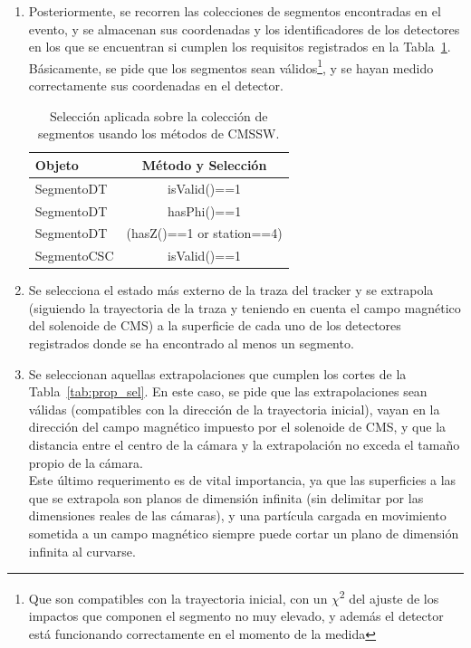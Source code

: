 \begin{enumerate}
\item Posteriormente, se recorren las colecciones de segmentos encontradas en el evento, y se almacenan sus coordenadas y los identificadores de los detectores en los que se encuentran si cumplen los requisitos registrados en la Tabla~\ref{tab:segment_sel}. B\'asicamente, se pide que los segmentos sean v\'alidos\footnote{Que son compatibles con la trayectoria inicial, con un $\chi$\textsuperscript{2} del ajuste de los impactos que componen el segmento no muy elevado, y adem\'as el detector est\'a funcionando correctamente en el momento de la medida}, y se hayan medido correctamente sus coordenadas en el detector.

\begin{table}[htbp]
  \begin{center}
    {\normalsize
      \begin{tabular} {lc}
        \hline
        \hline
        Objeto & M\'etodo y Selecci\'on                    \\
        \hline
        SegmentoDT            & isValid()==1               \\
        SegmentoDT            & hasPhi()==1                \\
        SegmentoDT            & (hasZ()==1 or station==4)  \\
        SegmentoCSC           & isValid()==1               \\
        \hline
      \end{tabular}
    }
    \caption{Selecci\'on aplicada sobre la colecci\'on de segmentos usando los m\'etodos de CMSSW.}
    \label{tab:segment_sel}
  \end{center}
\end{table}


\item Se selecciona el estado m\'as externo de la traza del tracker y se extrapola (siguiendo la trayectoria de la traza y teniendo en cuenta el campo magn\'etico del solenoide de CMS) a la superficie de cada uno de los detectores registrados donde se ha encontrado al menos un segmento.
\item Se seleccionan aquellas extrapolaciones que cumplen los cortes de la Tabla~\ref{tab:prop_sel}. En este caso, se pide que las extrapolaciones sean v\'alidas (compatibles con la direcci\'on de la trayectoria inicial), vayan en la direcci\'on del campo magn\'etico impuesto por el solenoide de CMS, y que la distancia entre el centro de la c\'amara y la extrapolaci\'on no exceda el tama\~no propio de la c\'amara. \\
Este \'ultimo requerimento es de vital importancia, ya que las superficies a las que se extrapola son planos de dimensi\'on infinita (sin delimitar por las dimensiones reales de las c\'amaras), y una part\'icula cargada en movimiento sometida a un campo magn\'etico siempre puede cortar un plano de dimensi\'on infinita al curvarse.


\end{enumerate}
